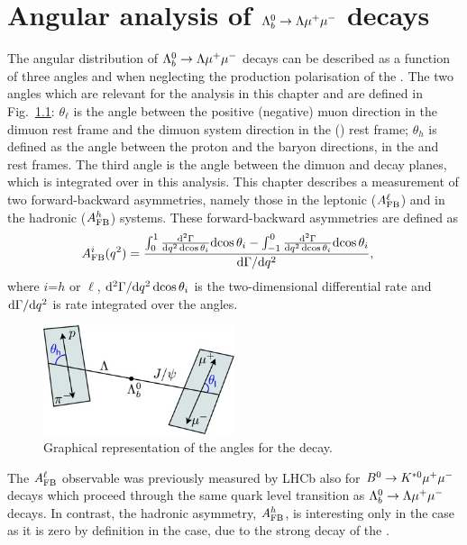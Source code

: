 \chapter{Angular analysis of $\protect\Lambda^0_b\rightarrow\Lambda\mu^+\mu^-$ decays}
\label{sec:ang_ana}

The angular distribution of $\Lambda^0_b\rightarrow\Lambda\mu^+\mu^-$ decays can be described 
as a function of three angles and \qsq  when neglecting the production polarisation of the \Lb.
 The two angles which are relevant for the
analysis in this chapter and are defined in Fig.~\ref{fig:Lb_angles}: $\theta_\ell$ is the angle between 
the positive (negative) muon direction in the dimuon rest frame and the dimuon system direction in the \Lb (\Lbbar) 
rest frame; $\theta_h$ is defined as the angle between the proton and the \Lz baryon directions, 
in the \Lz and \Lb rest frames. The third angle is the angle between the dimuon and \Lz decay planes, which is integrated
over in this analysis. %
This chapter describes a measurement of two forward-backward asymmetries, namely those in the leptonic
($A_{\rm FB}^\ell$) and in the hadronic ($A_{\rm FB}^h$) systems. These forward-backward asymmetries
are defined as
\begin{align}
A_{\rm FB}^i(q^2)&=\frac{\int_0^1 \frac{\mathrm{d}^2\Gamma}{\mathrm{d}q^2\,\mathrm{d}\!\cos\theta_i} \mathrm{d}\!\cos\theta_i-
               \int^0_{-1} \frac{\mathrm{d}^2\Gamma}{\mathrm{d}q^2\,\mathrm{d}\!\cos\theta_i} \mathrm{d}\!\cos\theta_i}{\mathrm{d}\Gamma / \mathrm{d} q^2},
\label{eq:afbTh}
\end{align}
where $i$=$h$ or $\ell$, $\mathrm{d}^2\Gamma/\mathrm{d} q^2\,\mathrm{d}\!\cos\theta_i$ is the two-dimensional differential rate and
$\mathrm{d}\Gamma / \mathrm{d}q^2$ is rate integrated over the angles. 

\begin{figure}[h!]
\centering
\includegraphics[width=0.5\textwidth]{Lmumu/figs/angles.jpeg}
\caption{Graphical representation of the angles for the \decay{\Lb}{\Lz\mumu} decay.}
\label{fig:Lb_angles}
\end{figure}

The $A_{\rm FB}^\ell$ observable was previously measured by LHCb also for $B^0\rightarrow K^{*0}\mu^+\mu^-$ decays
which proceed through the same quark level transition as $\Lambda^0_b\rightarrow\Lambda\mu^+\mu^-$ decays. In contrast, the hadronic
asymmetry, $A_{\rm FB}^h$, is interesting only in the \Lb case as it is zero by definition
in the \Bz case, due to the strong decay of the \Kstarz.

